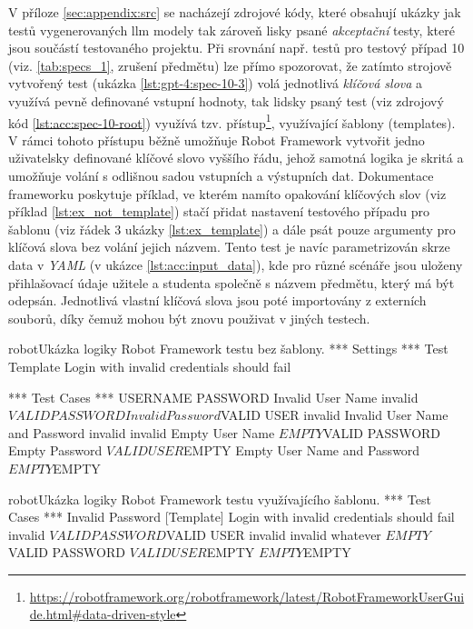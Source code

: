 \documentclass[czech, ma, kiv, he, iso690alph, pdf, viewonly]{fasthesis}
\begin{document}
        V příloze \ref{sec:appendix:src} se nacházejí zdrojové kódy, které obsahují ukázky jak testů vygenerovaných \Gls{llm} modely tak zároveň lisky psané \textit{akceptační} testy, které jsou součástí testovaného projektu. Při srovnání např. testů pro testový případ 10 (viz. \ref{tab:specs_1}, zrušení předmětu) lze přímo spozorovat, že zatímto strojově vytvořený test (ukázka \ref{lst:gpt-4:spec-10-3}) volá jednotlivá \textit{klíčová slova} a využívá pevně definované vstupní hodnoty, tak lidsky psaný test (viz zdrojový kód \ref{lst:acc:spec-10-root}) využívá tzv.  přístup\footnote{\url{https://robotframework.org/robotframework/latest/RobotFrameworkUserGuide.html#data-driven-style}}, využívající šablony (templates). V rámci tohoto přístupu běžně umožňuje Robot Framework vytvořit jedno uživatelsky definované klíčové slovo vyššího řádu, jehož samotná logika je skritá a umožňuje volání s odlišnou sadou vstupních a výstupních dat. Dokumentace frameworku poskytuje příklad, ve kterém namíto opakování klíčových slov (viz příklad \ref{lst:ex_not_template}) stačí přidat nastavení testového případu pro šablonu (viz řádek 3 ukázky \ref{lst:ex_template}) a dále psát pouze argumenty pro klíčová slova bez volání jejich názvem. Tento test je navíc parametrizován skrze data v \textit{YAML} (v ukázce \ref{lst:acc:input_data}), kde pro různé scénáře jsou uloženy přihlašovací údaje užitele a studenta společně s názvem předmětu, který má být odepsán. Jednotlivá vlastní klíčová slova jsou poté importovány z externích souborů, díky čemuž mohou být znovu použivat v jiných testech.

        \begin{code}{robot}{Ukázka logiky Robot Framework testu bez šablony. \label{lst:ex_not_template}}
*** Settings ***
Test Template    Login with invalid credentials should fail

*** Test Cases ***                USERNAME         PASSWORD
Invalid User Name                 invalid          ${VALID PASSWORD}
Invalid Password                  ${VALID USER}    invalid
Invalid User Name and Password    invalid          invalid
Empty User Name                   ${EMPTY}         ${VALID PASSWORD}
Empty Password                    ${VALID USER}    ${EMPTY}
Empty User Name and Password      ${EMPTY}         ${EMPTY}\end{code}

        \begin{code}{robot}{Ukázka logiky Robot Framework testu využívajícího šablonu. \label{lst:ex_template}}
*** Test Cases ***
Invalid Password
    [Template]    Login with invalid credentials should fail
    invalid          ${VALID PASSWORD}
    ${VALID USER}    invalid
    invalid          whatever
    ${EMPTY}         ${VALID PASSWORD}
    ${VALID USER}    ${EMPTY}
    ${EMPTY}         ${EMPTY}\end{code}
\end{document}

